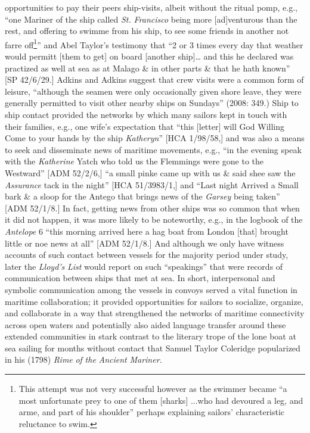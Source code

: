 opportunities to pay their peers ship-visits, albeit without the ritual pomp, e.g., “one Mariner of the ship called \textit{St.} \textit{Francisco} being more [ad]venturous than the rest, and offering to swimme from his ship, to see some friends in another not farre off\footnote{This attempt was not very successful however as the swimmer became “a most unfortunate prey to one of them [sharks] ...who had devoured a leg, and arme, and part of his shoulder” \citep[21]{Gage1648} perhaps explaining sailors’ characteristic reluctance to swim.}” \citep[21,]{Gage1648} and Abel Taylor’s testimony that “2 or 3 times every day that weather would permitt [them to get] on board [another ship]… and this he declared was practized as well at sea as at Malago \& in other parts \& that he hath known” [SP 42/6/29.] Adkins and Adkins suggest that crew visits were a common form of leisure, “although the seamen were only occasionally given shore leave, they were generally permitted to visit other nearby ships on Sundays” (2008: 349.) Ship to ship contact provided the networks by which many sailors kept in touch with their families, e.g., one wife’s expectation that “this [letter] will God Willing Come to your hands by the ship \textit{Katheryn}” [HCA 1/98/58,] and was also a means to seek and disseminate news of maritime movements, e.g., “in the evening speak with the \textit{Katherine} Yatch who told us the Flemmings were gone to the Westward” [ADM 52/2/6,] “a small pinke came up with us \& said shee saw the \textit{Assurance} tack in the night” [HCA 51/3983/1,] and “Last night Arrived a Small bark \& a sloop for the Antego that brings news of the \textit{Garsey} being taken” [ADM 52/1/8.] In fact, getting news from other ships was so common that when it did not happen, it was more likely to be noteworthy, e.g., in the logbook of the \textit{Antelope} 6 \citealt{March1691} “this morning arrived here a hag boat from London [that] brought little or noe news at all” [ADM 52/1/8.] And although we only have witness accounts of such contact between vessels for the majority period under study, later the \textit{Lloyd's} \textit{List} would report on such “speakings” that were records of communication between ships that met at sea. In short, interpersonal and symbolic communication among the vessels in convoys served a vital function in maritime collaboration; it provided opportunities for sailors to socialize, organize, and collaborate in a way that strengthened the networks of maritime connectivity across open waters and potentially also aided language transfer around these extended communities in stark contrast to the literary trope of the lone boat at sea sailing for months without contact that Samuel Taylor Coleridge popularized in his (1798) \textit{Rime} \textit{of} \textit{the} \textit{\MakeUppercase{A}}\textit{ncient} \textit{Mariner.} 

